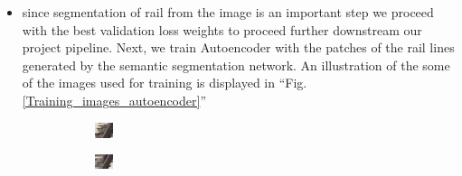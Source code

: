 \documentclass[conference]{IEEEtran}
\begin{document}
\begin{itemize}
\item since segmentation of rail from the image is an important step we proceed with the best validation loss weights to proceed further downstream our project pipeline. Next, we train Autoencoder with the patches of the rail lines generated by the semantic segmentation network. An illustration of the some of the images used for training is displayed in ``Fig. \ref{Training_images_autoencoder}'' 

\begin{figure}[htbp]
\begin{subfigure}[b]{0.05\textwidth}
 \centerline{\includegraphics[width=\textwidth]{Autoencoder_jpgs/frame10_2_4.png}}
\end{subfigure}
\hfill
\begin{subfigure}[b]{0.05\textwidth}
 \centerline{\includegraphics[width=\textwidth]{Autoencoder_jpgs/frame10_2_5.png}}

\end{subfigure}
\end{figure}
\end{itemize}
\end{document}
